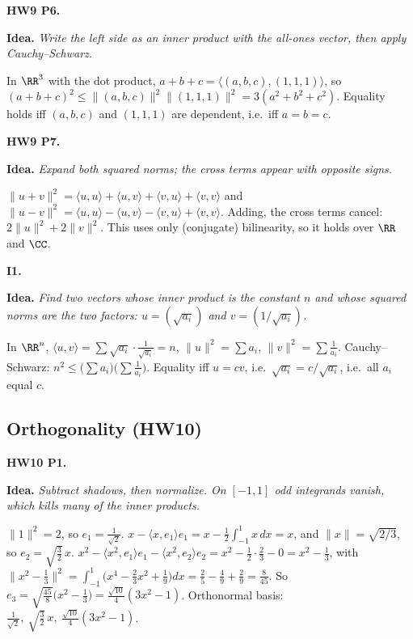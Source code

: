 \documentclass[10pt]{scrartcl}
\newcommand{\ip}[2]{\langle #1,#2\rangle}
\newcommand{\idea}[1]{{\color{OliveGreen!75!black}\textbf{Idea.}} \textit{#1}\par}
\newenvironment{prob}{\par\medskip\noindent\begin{minipage}{\linewidth}\setlength{\parskip}{3pt}}{\end{minipage}\par}
\begin{document}
\begin{prob}
\textbf{HW9 P6. }\par 
\idea{Write the left side as an inner product with the all-ones vector, then apply Cauchy--Schwarz.}In $\RR^3$ with the dot product, $a+b+c=\ip{(a,b,c)}{(1,1,1)}$, so $(a+b+c)^2\le\|(a,b,c)\|^2\|(1,1,1)\|^2=3(a^2+b^2+c^2)$. Equality holds iff $(a,b,c)$ and $(1,1,1)$ are dependent, i.e.\ iff $a=b=c$.
\end{prob}

\begin{prob}
\textbf{HW9 P7. }\par 
\idea{Expand both squared norms; the cross terms appear with opposite signs.}$\|u+v\|^2=\ip uu+\ip uv+\ip vu+\ip vv$ and $\|u-v\|^2=\ip uu-\ip uv-\ip vu+\ip vv$. Adding, the cross terms cancel: $2\|u\|^2+2\|v\|^2$. This uses only (conjugate) bilinearity, so it holds over $\RR$ and $\CC$.
\end{prob}

\begin{prob}
\textbf{I1. }\par 
\idea{Find two vectors whose inner product is the constant $n$ and whose squared norms are the two factors: $u=(\sqrt{a_i})$ and $v=(1/\sqrt{a_i})$.}
In $\RR^n$, $\ip uv=\sum\sqrt{a_i}\cdot\frac1{\sqrt{a_i}}=n$, $\|u\|^2=\sum a_i$, $\|v\|^2=\sum\frac1{a_i}$. Cauchy--Schwarz: $n^2\le\big(\sum a_i\big)\big(\sum\frac1{a_i}\big)$. Equality iff $u=cv$, i.e.\ $\sqrt{a_i}=c/\sqrt{a_i}$, i.e.\ all $a_i$ equal $c$.
\end{prob}

\subsection{Orthogonality (HW10)}

\begin{prob}
\textbf{HW10 P1. }\par 
\idea{Subtract shadows, then normalize. On $[-1,1]$ odd integrands vanish, which kills many of the inner products.}$\|1\|^2=2$, so $e_1=\frac1{\sqrt2}$. $x-\ip x{e_1}e_1=x-\frac12\int_{-1}^1x\,dx=x$, and $\|x\|=\sqrt{2/3}$, so $e_2=\sqrt{\tfrac32}\,x$. $x^2-\ip{x^2}{e_1}e_1-\ip{x^2}{e_2}e_2=x^2-\frac12\cdot\frac23-0=x^2-\frac13$, with $\|x^2-\frac13\|^2=\int_{-1}^1\big(x^4-\frac23x^2+\frac19\big)dx=\frac25-\frac49+\frac29=\frac8{45}$. So $e_3=\sqrt{\tfrac{45}8}\big(x^2-\frac13\big)=\frac{\sqrt{10}}4(3x^2-1)$. Orthonormal basis: $\frac1{\sqrt2},\ \sqrt{\frac32}\,x,\ \frac{\sqrt{10}}4(3x^2-1)$.
\end{prob}
\end{document}
